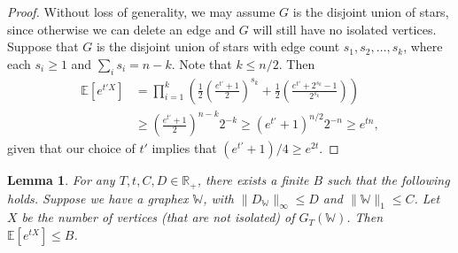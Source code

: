 \documentclass{amsart}
\numberwithin{equation}{section}
\numberwithin{figure}{section}
\newtheorem{lemma}[theorem]{Lemma}
\theoremstyle{definition}
\theoremstyle{remark}
\newcommand{\EE}{\mathbb{E}}
\newcommand{\RR}{\mathbb{R}}
\newcommand{\cW}{\mathbb{W}}
\begin{document}
\begin{proof}
Without loss of generality, we may assume $G$ is the disjoint union of stars,
since otherwise we can delete an edge and $G$ will still have no isolated
vertices. Suppose that $G$ is the disjoint union of stars with edge count
$s_1,s_2,\dots,s_k$, where each $s_i \ge 1$ and $\sum_i s_i=n-k$. Note that
$k \le n/2$. Then
\begin{align*}
\EE\left[ e^{t'X} \right]&=\prod_{i=1}^k \left( \frac{1}{2}\left(\frac{e^{t'}+1}{2}\right)^{s_k}+
\frac{1}{2}\left(\frac{e^{t'}+2^{s_k}-1}{2^{s_k}}\right) \right)\\
& \ge \left(\frac{e^{t'}+1}{2}\right)^{n-k}2^{-k}
\ge (e^{t'}+1)^{n/2}2^{-n}
 \ge e^{tn},
\end{align*}
given that our choice of $t'$ implies that $(e^{t'}+1)/4\geq e^{2t}$.
\end{proof}

\begin{lemma} \label{lemmaboundedgraphexmomentgenfinite}
For any $T,t,C,D \in \RR_+$, there exists a finite $B$ such that the
following holds. Suppose we have a graphex $\cW$, with $\|D_\cW\|_\infty \le
D$ and $\|\cW\|_1 \le C$. Let $X$ be the number of vertices (that are not
isolated) of $G_T(\cW)$. Then $\EE[e^{tX}] \le B$.
\end{lemma}
\end{document}
